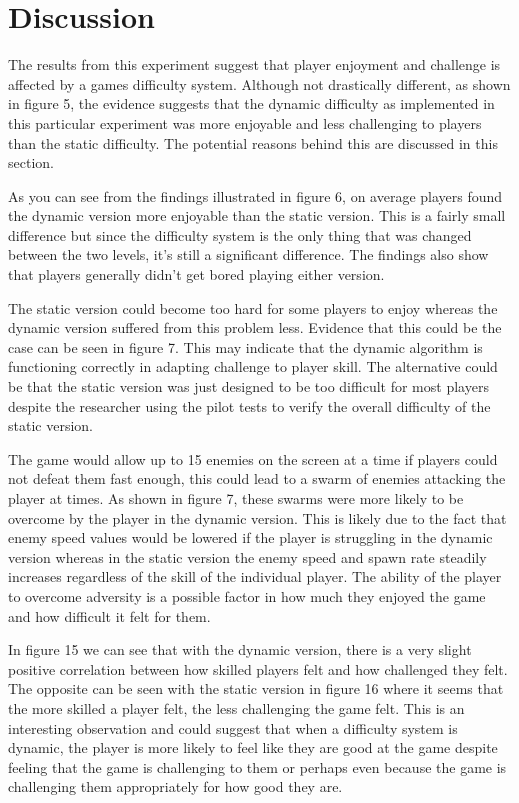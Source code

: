 \documentclass[journal]{IEEEtran}
\begin{document}
\section{Discussion}
The results from this experiment suggest that player enjoyment and challenge is affected by a games difficulty system. Although not drastically different, as shown in figure 5, the evidence suggests that the dynamic difficulty as implemented in this particular experiment was more enjoyable and less challenging to players than the static difficulty. The potential reasons behind this are discussed in this section.

As you can see from the findings illustrated in figure 6, on average players found the dynamic version more enjoyable than the static version. This is a fairly small difference but since the difficulty system is the only thing that was changed between the two levels, it's still a significant difference. The findings also show that players generally didn't get bored playing either version. 

The static version could become too hard for some players to enjoy whereas the dynamic version suffered from this problem less. Evidence that this could be the case can be seen in figure 7. This may indicate that the dynamic algorithm is functioning correctly in adapting challenge to player skill. The alternative could be that the static version was just designed to be too difficult for most players despite the researcher using the pilot tests to verify the overall difficulty of the static version.

The game would allow up to 15 enemies on the screen at a time if players could not defeat them fast enough, this could lead to a swarm of enemies attacking the player at times. As shown in figure 7, these swarms were more likely to be overcome by the player in the dynamic version. This is likely due to the fact that enemy speed values would be lowered if the player is struggling in the dynamic version whereas in the static version the enemy speed and spawn rate steadily increases regardless of the skill of the individual player. The ability of the player to overcome adversity is a possible factor in how much they enjoyed the game and how difficult it felt for them.

In figure 15 we can see that with the dynamic version, there is a very slight positive correlation between how skilled players felt and how challenged they felt. The opposite can be seen with the static version in figure 16 where it seems that the more skilled a player felt, the less challenging the game felt. This is an interesting observation and could suggest that when a difficulty system is dynamic, the player is more likely to feel like they are good at the game despite feeling that the game is challenging to them or perhaps even because the game is challenging them appropriately for how good they are.
\end{document}
